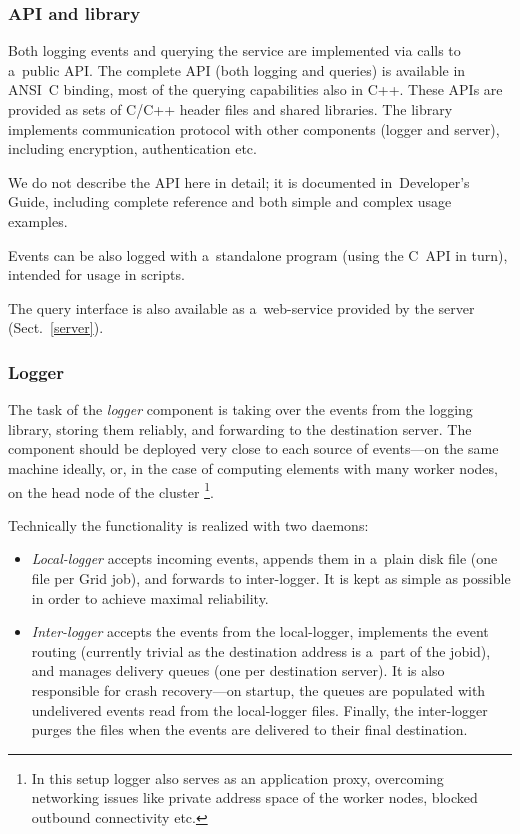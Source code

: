 \subsubsection{\LB API and library}
Both logging events and querying the service are implemented via
calls to a~public \LB API.
The complete API (both logging and queries)
is available in ANSI~C binding, most of the querying capabilities also in C++.
These APIs are provided as sets of C/C++ header files and shared libraries.
The library implements communication protocol with other \LB components
(logger and server), including encryption, authentication etc.

We do not describe the API here in detail; it is documented in~\LB Developer's
Guide\cite{lbdg},
including complete reference and both simple and complex usage examples.

Events can be also logged with a~standalone program (using the C~API in turn),
intended for usage in scripts.

The query interface is also available as a~web-service provided by the
\LB server (Sect.~\ref{server}).

\subsubsection{Logger}
The task of the \emph{logger} component is taking over the events from
the logging library, storing them reliably, and forwarding to the destination
server.
The component should be deployed very close to each source of events---on the
same machine ideally, or, in the case of computing elements with many
worker nodes, on the head node of the cluster%
\footnote{In this setup logger also serves as an application proxy,
overcoming networking issues like private address space of the worker nodes,
blocked outbound connectivity etc.}.

Technically the functionality is realized with two daemons:
\begin{itemize}
\item \emph{Local-logger} accepts incoming events,
appends them in a~plain disk file (one file per Grid job),
and forwards to inter-logger.
It is kept as simple as possible in order to achieve
maximal reliability. 
\item \emph{Inter-logger} accepts the events from the local-logger,
implements the event routing (currently trivial as the destination
address is a~part of the jobid), and manages
delivery queues (one per destination server).
It is also responsible for crash recovery---on startup, the queues are
populated with undelivered events read from the local-logger files.
Finally, the inter-logger purges the files when the events are delivered to
their final destination.
\end{itemize}

